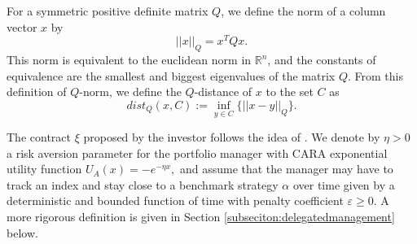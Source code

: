 \documentclass[11pt,a4paper]{article}
\theoremstyle{thmstyleone}%
\theoremstyle{thmstyletwo}%
\theoremstyle{thmstylethree}%
\begin{document}
For a symmetric positive definite matrix $Q$, we define the norm of a column vector $x$ by 
\[
    ||x||_{Q} = x^T Q x.
\]
This norm is equivalent to the euclidean norm in $\mathbb{R}^n$, and the constants of equivalence are the smallest and biggest eigenvalues of the matrix $Q$.
From this definition of $Q$-norm, we define the $Q$-distance of $x$ to the set $C$ as 
\[
    dist_Q(x, C) := \inf_{y \in C} \{ ||x - y||_Q \}.
\]


The contract $\xi$ proposed by the investor follows the idea of \cite{cvitanic2017moral}. We denote by $\eta>0$ a risk aversion parameter for the portfolio manager with CARA exponential utility function $U_A(x)=-e^{-\eta x},$ and assume that the manager may have to track an index and stay close to a benchmark strategy $\alpha$ over time given by a deterministic and bounded function of time with penalty coefficient $\varepsilon\geq 0$. A more rigorous definition is given in Section \ref{subseciton:delegatedmanagement} below. 
\end{document}
